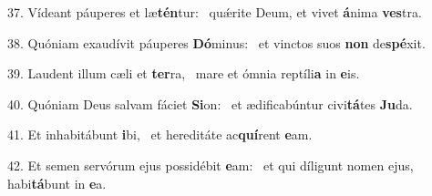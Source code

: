 37. Vídeant páuperes et læ\textbf{tén}tur: \ast\  quǽrite Deum, et vivet \textbf{á}nima \textbf{ves}tra.\

38. Quóniam exaudívit páuperes \textbf{Dó}minus: \ast\  et vinctos suos \textbf{non} de\textbf{spé}xit.\

39. Laudent illum cæli et \textbf{ter}ra, \ast\  mare et ómnia reptíli\textbf{a} in \textbf{e}is.\

40. Quóniam Deus salvam fáciet \textbf{Si}on: \ast\  et ædificabúntur civi\textbf{tá}tes \textbf{Ju}da.\

41. Et inhabitábunt \textbf{i}bi, \ast\  et hereditáte ac\textbf{quí}rent \textbf{e}am.\

42. Et semen servórum ejus possidébit \textbf{e}am: \ast\  et qui díligunt nomen ejus, habi\textbf{tá}bunt in \textbf{e}a.\

